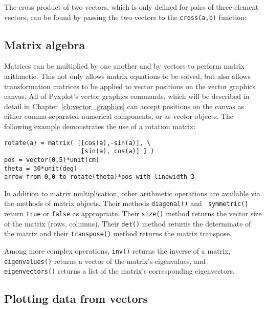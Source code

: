 \vspace{3mm}

\vspace{3mm}

\noindent
The cross product of two vectors, which is only defined for pairs of three-element vectors, can be found by passing the two vectors to the {\tt cross(a,b)} function:

\vspace{3mm}

\vspace{3mm}


\subsection{Matrix algebra}

Matrices can be multiplied by one another and by vectors to perform matrix
arithmetic. This not only allows matrix equations to be solved, but also allows
transformation matrices to be applied to vector positions on the vector
graphics canvas. All of Pyxplot's vector graphics commands, which will be
described in detail in Chapter~\ref{ch:vector_graphics} can accept positions on
the canvas as either comma-separated numerical components, or as vector
objects. The following example demonstrates the use of a rotation matrix:

\begin{verbatim}
rotate(a) = matrix( [[cos(a),-sin(a)], \
                     [sin(a), cos(a)] ] )
pos = vector(0,5)*unit(cm)
theta = 30*unit(deg)
arrow from 0,0 to rotate(theta)*pos with linewidth 3
\end{verbatim}

In addition to matrix multiplication, other arithmetic operations are available
via the methods of matrix objects. Their methods {\tt diagonal()} and {\tt
symmetric()} return {\tt true} or {\tt false} as appropriate. Their {\tt size()}
method returns the vector size of the matrix (rows, columns). Their {\tt det()}
method returns the determinate of the matrix and their {\tt transpose()} method
returns the matrix transpose.

Among more complex operations, {\tt inv()} returns the inverse of a matrix,
{\tt eigen\-values()} returns a vector of the matrix's eigen\-values, and {\tt
eigen\-vectors()} returns a list of the matrix's corresponding eigen\-vectors.

\subsection{Plotting data from vectors}


